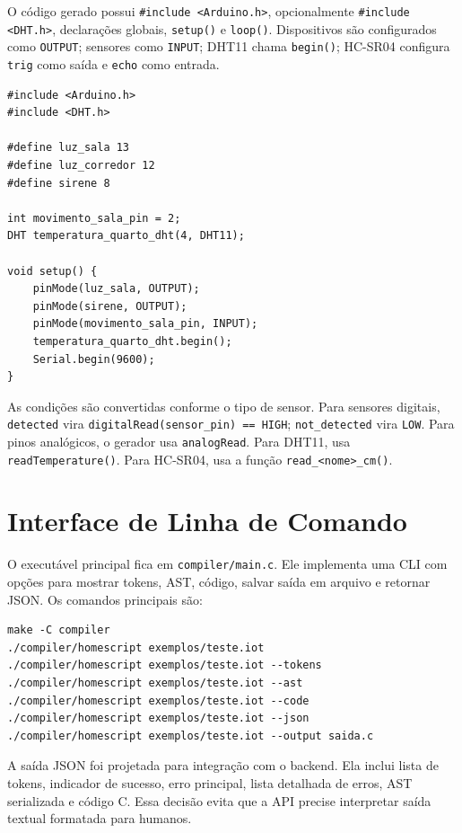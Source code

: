 \documentclass[conference]{IEEEtran}
\begin{document}
O código gerado possui \texttt{\#include <Arduino.h>}, opcionalmente \texttt{\#include <DHT.h>}, declarações globais, \texttt{setup()} e \texttt{loop()}. Dispositivos são configurados como \texttt{OUTPUT}; sensores como \texttt{INPUT}; DHT11 chama \texttt{begin()}; HC-SR04 configura \texttt{trig} como saída e \texttt{echo} como entrada.

\begin{lstlisting}[style=csmall,caption={Estrutura de Inicialização do Código Gerado para Hardware Integrado.},label={lst:generated}]
#include <Arduino.h>
#include <DHT.h>

#define luz_sala 13
#define luz_corredor 12
#define sirene 8

int movimento_sala_pin = 2;
DHT temperatura_quarto_dht(4, DHT11);

void setup() {
    pinMode(luz_sala, OUTPUT);
    pinMode(sirene, OUTPUT);
    pinMode(movimento_sala_pin, INPUT);
    temperatura_quarto_dht.begin();
    Serial.begin(9600);
}
\end{lstlisting}

As condições são convertidas conforme o tipo de sensor. Para sensores digitais, \texttt{detected} vira \texttt{digitalRead(sensor\_pin) == HIGH}; \texttt{not\_detected} vira \texttt{LOW}. Para pinos analógicos, o gerador usa \texttt{analogRead}. Para DHT11, usa \texttt{readTemperature()}. Para HC-SR04, usa a função \texttt{read\_<nome>\_cm()}.

\section{Interface de Linha de Comando}
O executável principal fica em \texttt{compiler/main.c}. Ele implementa uma CLI com opções para mostrar tokens, AST, código, salvar saída em arquivo e retornar JSON. Os comandos principais são:

\begin{lstlisting}[basicstyle=\ttfamily\scriptsize,frame=single,breaklines=true]
make -C compiler
./compiler/homescript exemplos/teste.iot
./compiler/homescript exemplos/teste.iot --tokens
./compiler/homescript exemplos/teste.iot --ast
./compiler/homescript exemplos/teste.iot --code
./compiler/homescript exemplos/teste.iot --json
./compiler/homescript exemplos/teste.iot --output saida.c
\end{lstlisting}

A saída JSON foi projetada para integração com o backend. Ela inclui lista de tokens, indicador de sucesso, erro principal, lista detalhada de erros, AST serializada e código C. Essa decisão evita que a API precise interpretar saída textual formatada para humanos.
\end{document}

